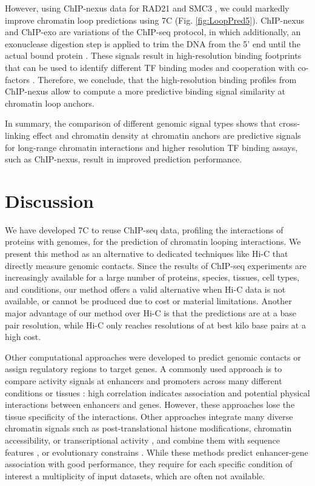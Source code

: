 \documentclass[a4paper,twoside=true,openright,parskip=full,chapterprefix=true,11pt,headings=normal,bibliography=totoc,listof=totoc,titlepage=on,captions=tableabove,draft=false]{scrreprt}
\theoremstyle{definition}
\theoremstyle{definition}
\theoremstyle{definition}
\theoremstyle{remark}
\begin{document}
However, using ChIP-nexus data for RAD21 and SMC3 \citep{Tang2015}, we
could markedly improve chromatin loop predictions using 7C (Fig.
\ref{fig:LoopPred5}). ChIP-nexus and ChIP-exo are variations of the
ChIP-seq protocol, in which additionally, an exonuclease digestion step
is applied to trim the DNA from the 5' end until the actual bound
protein \citep{Rhee2011, He2015a}. These signals result in
high-resolution binding footprints that can be used to identify
different TF binding modes and cooperation with co-factors
\citep{Starick2015}. Therefore, we conclude, that the high-resolution
binding profiles from ChIP-nexus allow to compute a more predictive
binding signal similarity at chromatin loop anchors.

In summary, the comparison of different genomic signal types shows that
cross-linking effect and chromatin density at chromatin anchors are
predictive signals for long-range chromatin interactions and higher
resolution TF binding assays, such as ChIP-nexus, result in improved
prediction performance.

\hypertarget{discussion-2}{%
\section{Discussion}\label{discussion-2}}

We have developed 7C to reuse ChIP-seq data, profiling the interactions
of proteins with genomes, for the prediction of chromatin looping
interactions. We present this method as an alternative to dedicated
techniques like Hi-C that directly measure genomic contacts. Since the
results of ChIP-seq experiments are increasingly available for a large
number of proteins, species, tissues, cell types, and conditions, our
method offers a valid alternative when Hi-C data is not available, or
cannot be produced due to cost or material limitations. Another major
advantage of our method over Hi-C is that the predictions are at a base
pair resolution, while Hi-C only reaches resolutions of at best kilo
base pairs at a high cost.

Other computational approaches were developed to predict genomic
contacts or assign regulatory regions to target genes. A commonly used
approach is to compare activity signals at enhancers and promoters
across many different conditions or tissues
\citep{Sheffield2013, Fishilevich2017, Andersson2014, OConnor2014}: high
correlation indicates association and potential physical interactions
between enhancers and genes. However, these approaches lose the tissue
specificity of the interactions. Other approaches integrate many diverse
chromatin signals such as post-translational histone modifications,
chromatin accessibility, or transcriptional activity
\citep{Roy2015, Whalen2016, Zhu2016, Schreiber2017, Dzida2017}, and
combine them with sequence features \citep{Zhao2016}, or evolutionary
constrains \citep{Naville2015}. While these methods predict
enhancer-gene association with good performance, they require for each
specific condition of interest a multiplicity of input datasets, which
are often not available.
\end{document}
